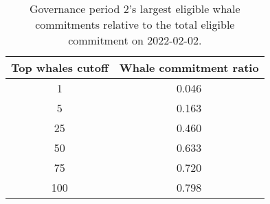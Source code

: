 %
\begin{longtable}[c]{ c c }
\caption{Governance period 2's largest eligible whale commitments relative to the total eligible commitment on 2022-02-02.} \\
\hline
\textbf{Top whales cutoff} & \textbf{Whale commitment ratio} \\
\hline
1 & 0.046 \\ 
5 & 0.163 \\ 
25 & 0.460 \\ 
50 & 0.633 \\ 
75 & 0.720 \\ 
100 & 0.798 \\ 
\hline 
\end{longtable} 
